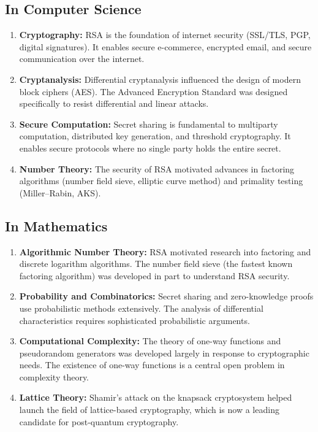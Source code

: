 \subsection{In Computer Science}

\begin{enumerate}
    \item \textbf{Cryptography:} RSA is the foundation of internet security (SSL/TLS, PGP, digital signatures). It enables secure e-commerce, encrypted email, and secure communication over the internet.
    \item \textbf{Cryptanalysis:} Differential cryptanalysis influenced the design of modern block ciphers (AES). The Advanced Encryption Standard was designed specifically to resist differential and linear attacks.
    \item \textbf{Secure Computation:} Secret sharing is fundamental to multiparty computation, distributed key generation, and threshold cryptography. It enables secure protocols where no single party holds the entire secret.
    \item \textbf{Number Theory:} The security of RSA motivated advances in factoring algorithms (number field sieve, elliptic curve method) and primality testing (Miller--Rabin, AKS).
\end{enumerate}

\subsection{In Mathematics}

\begin{enumerate}
    \item \textbf{Algorithmic Number Theory:} RSA motivated research into factoring and discrete logarithm algorithms. The number field sieve (the fastest known factoring algorithm) was developed in part to understand RSA security.
    \item \textbf{Probability and Combinatorics:} Secret sharing and zero-knowledge proofs use probabilistic methods extensively. The analysis of differential characteristics requires sophisticated probabilistic arguments.
    \item \textbf{Computational Complexity:} The theory of one-way functions and pseudorandom generators was developed largely in response to cryptographic needs. The existence of one-way functions is a central open problem in complexity theory.
    \item \textbf{Lattice Theory:} Shamir's attack on the knapsack cryptosystem helped launch the field of lattice-based cryptography, which is now a leading candidate for post-quantum cryptography.
\end{enumerate}

